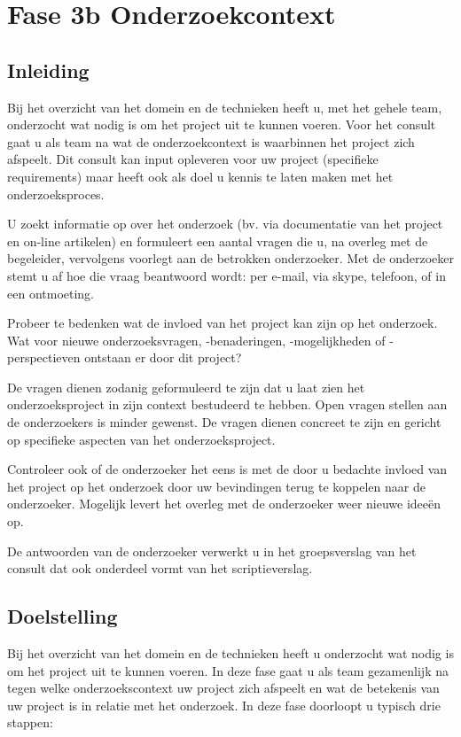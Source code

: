 \section{Fase 3b Onderzoekcontext}
\subsection{Inleiding}
Bij het overzicht van het domein en de technieken heeft u, met
het gehele team, onderzocht wat nodig is om het project uit te
kunnen voeren. Voor het consult gaat u als team na wat de
onderzoekcontext is waarbinnen het project zich afspeelt. Dit consult
kan input opleveren voor uw project (specifieke requirements)
maar heeft ook als doel u kennis te laten maken met het onderzoeksproces.

U zoekt informatie op over het onderzoek (bv. via documentatie
van het project en on-line artikelen) en formuleert een aantal
vragen die u, na overleg met de begeleider, vervolgens voorlegt
aan de betrokken onderzoeker. Met de onderzoeker stemt u af hoe die
vraag beantwoord wordt: per e-mail, via skype, telefoon, of in een
ontmoeting.

Probeer te bedenken wat de invloed van het project kan zijn op
het onderzoek. Wat voor nieuwe onderzoeksvragen, -benaderingen,
-mogelijkheden of -perspectieven ontstaan er door dit project?

De vragen dienen zodanig geformuleerd te zijn dat u laat zien
het onderzoeksproject in zijn context bestudeerd te hebben. Open
vragen stellen aan de onderzoekers is minder gewenst. De vragen
dienen concreet te zijn en gericht op specifieke aspecten van
het onderzoeksproject.

Controleer ook of de onderzoeker het eens is met de door u
bedachte invloed van het project op het onderzoek door uw
bevindingen terug te koppelen naar de onderzoeker. Mogelijk
levert het overleg met de onderzoeker weer nieuwe idee\"en op.

De antwoorden van de onderzoeker verwerkt u in het groepsverslag
van het consult dat ook onderdeel vormt van het scriptieverslag.

\subsection{Doelstelling}
Bij het overzicht van het domein en de technieken heeft u onderzocht wat
nodig is om het project uit te kunnen voeren. In deze fase gaat u als team
gezamenlijk na tegen welke onderzoekscontext uw project zich afspeelt en
wat de betekenis van uw project is in relatie met het onderzoek. In deze
fase doorloopt u typisch drie stappen:

